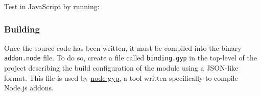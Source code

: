 \begin{Shaded}
\begin{Highlighting}[]
 \OperatorTok{(}\OperatorTok{*)} \OperatorTok{\{}
  \OperatorTok{(}\OperatorTok{==} \OperatorTok{);}
  \OperatorTok{(}\OperatorTok{==} \OperatorTok{);}
\OperatorTok{\}}

\OperatorTok{(}\OperatorTok{)} \OperatorTok{\{}
\OperatorTok{*}\OperatorTok{=}\OperatorTok{{-}\textgreater{}}\OperatorTok{();}

\OperatorTok{(}\OperatorTok{,}\OperatorTok{,} \OperatorTok{);}
\OperatorTok{(}\OperatorTok{,}\OperatorTok{,}\OperatorTok{);}
\OperatorTok{(}\OperatorTok{,}\OperatorTok{,}\OperatorTok{);}
\OperatorTok{\}}
\end{Highlighting}
\end{Shaded}

Test in JavaScript by running:

\begin{Shaded}
\begin{Highlighting}[]
\NormalTok{(}\NormalTok{)}\OperatorTok{;}
\end{Highlighting}
\end{Shaded}

\subsubsection{Building}\label{building}

Once the source code has been written, it must be compiled into the
binary \texttt{addon.node} file. To do so, create a file called
\texttt{binding.gyp} in the top-level of the project describing the
build configuration of the module using a JSON-like format. This file is
used by \href{https://github.com/nodejs/node-gyp}{node-gyp}, a tool
written specifically to compile Node.js addons.

